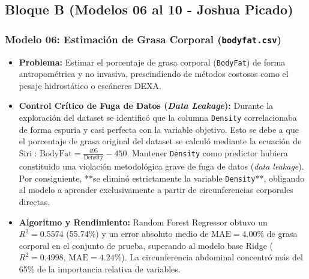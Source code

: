 \documentclass[12pt,letterpaper]{article}
\begin{document}
\subsection{Bloque B (Modelos 06 al 10 - Joshua Picado)}

\subsubsection{Modelo 06: Estimación de Grasa Corporal (\texttt{bodyfat.csv})}
\begin{itemize}[leftmargin=*]
    \item \textbf{Problema:} Estimar el porcentaje de grasa corporal (\texttt{BodyFat}) de forma antropométrica y no invasiva, prescindiendo de métodos costosos como el pesaje hidrostático o escáneres DEXA.
    \item \textbf{Control Crítico de Fuga de Datos (\textit{Data Leakage}):} Durante la exploración del dataset se identificó que la columna \texttt{Density} correlacionaba de forma espuria y casi perfecta con la variable objetivo. Esto se debe a que el porcentaje de grasa original del dataset se calculó mediante la ecuación de Siri \cite{siri1956body}: $\text{BodyFat} = \frac{495}{\text{Density}} - 450$. Mantener \texttt{Density} como predictor hubiera constituido una violación metodológica grave de fuga de datos (\textit{data leakage}). Por consiguiente, **se eliminó estrictamente la variable \texttt{Density}**, obligando al modelo a aprender exclusivamente a partir de circunferencias corporales directas.
    \item \textbf{Algoritmo y Rendimiento:} Random Forest Regressor obtuvo un $R^2 = \mathbf{0.5574}$ (55.74\%) y un error absoluto medio de $\text{MAE} = \mathbf{4.00\%}$ de grasa corporal en el conjunto de prueba, superando al modelo base Ridge ($R^2 = 0.4998$, $\text{MAE} = 4.24\%$). La circunferencia abdominal concentró más del 65\% de la importancia relativa de variables.
\end{itemize}
\end{document}
